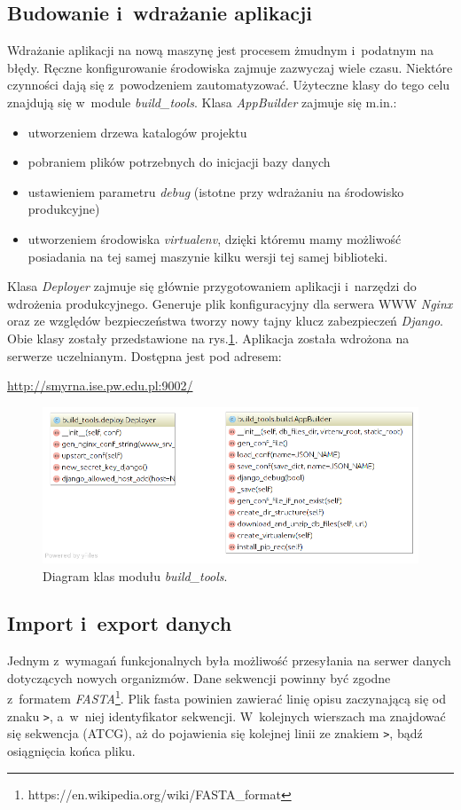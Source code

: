 \documentclass[a4paper,12pt,oneside]{mwrep}  %
\begin{document}
\subsection{Budowanie i~wdrażanie aplikacji}
Wdrażanie aplikacji na nową maszynę jest procesem żmudnym i~podatnym na błędy. Ręczne konfigurowanie środowiska zajmuje zazwyczaj wiele czasu. Niektóre czynności dają się z~powodzeniem zautomatyzować. Użyteczne klasy do tego celu znajdują się w~module \emph{\mbox{build\_tools}}. Klasa \emph{AppBuilder} zajmuje się m.in.:
\begin{itemize}
\item utworzeniem drzewa katalogów projektu
\item pobraniem plików potrzebnych do inicjacji bazy danych
\item ustawieniem parametru \emph{debug} (istotne przy wdrażaniu na środowisko produkcyjne)
\item utworzeniem środowiska \emph{virtualenv}, dzięki któremu mamy możliwość posiadania na tej samej maszynie kilku wersji tej samej biblioteki.
\end{itemize}
Klasa \emph{Deployer} zajmuje się głównie przygotowaniem aplikacji i~narzędzi do wdrożenia produkcyjnego. Generuje plik konfiguracyjny dla serwera WWW \emph{Nginx} oraz 
ze względów bezpieczeństwa tworzy nowy tajny klucz zabezpieczeń \emph{Django}. Obie klasy zostały przedstawione na rys.\ref{diagram_klas_appbuilder_deployer}.
Aplikacja została wdrożona na serwerze uczelnianym. Dostępna jest pod adresem:
\begin{center}
\url{http://smyrna.ise.pw.edu.pl:9002/}
\end{center} 
\begin{figure}[]
\centering
\includegraphics[width=1\textwidth]{grafika/model/final/appbuilder_deployer.png}
\caption{Diagram klas modułu \emph{build\_tools}.}
\label{diagram_klas_appbuilder_deployer}
\end{figure}

\subsection{Import i~export danych}
Jednym z~wymagań funkcjonalnych była możliwość przesyłania na serwer danych dotyczących nowych organizmów. Dane sekwencji powinny być zgodne z~formatem \emph{FASTA}\footnote{https://en.wikipedia.org/wiki/FASTA\_format}. Plik fasta powinien zawierać linię opisu zaczynającą się od znaku \verb|>|, a~w~niej identyfikator sekwencji. W~kolejnych wierszach ma znajdować się sekwencja (ATCG), aż do pojawienia się kolejnej linii ze znakiem \verb|>|, bądź osiągnięcia końca pliku.
\end{document}
